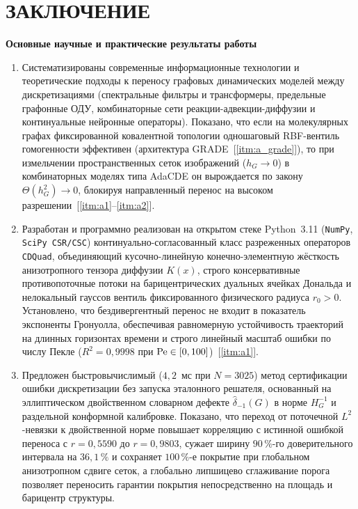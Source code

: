 
\chapter*{\large ЗАКЛЮЧЕНИЕ}

\textbf{Основные научные и практические результаты работы}

\begin{enumerate}
    \item Систематизированы современные информационные технологии и теоретические подходы к переносу графовых динамических моделей между дискретизациями (спектральные фильтры и трансформеры, предельные графонные ОДУ, комбинаторные сети реакции-адвекции-диффузии и континуальные нейронные операторы). Показано, что если на молекулярных графах фиксированной ковалентной топологии одношаговый RBF-вентиль гомогенности эффективен (архитектура GRADE~[\ref{itm:a_grade}]), то при измельчении пространственных сеток изображений ($h_G\to 0$) в комбинаторных моделях типа AdaCDE он вырождается по закону $\Theta(h_G^2)\to 0$, блокируя направленный перенос на высоком разрешении~[\ref{itm:a1}--\ref{itm:a2}].
    \item Разработан и программно реализован на открытом стеке Python~3.11 (\texttt{NumPy}, \texttt{SciPy CSR/CSC}) континуально-согласованный класс разреженных операторов \texttt{CDQuad}, объединяющий кусочно-линейную конечно-элементную жёсткость анизотропного тензора диффузии $K(x)$, строго консервативные противопоточные потоки на барицентрических дуальных ячейках Дональда и нелокальный гауссов вентиль фиксированного физического радиуса $r_0>0$. Установлено, что бездивергентный перенос не входит в показатель экспоненты Гронуолла, обеспечивая равномерную устойчивость траекторий на длинных горизонтах времени и строго линейный масштаб ошибки по числу Пекле ($R^2=0{,}9998$ при $\operatorname{Pe}\in[0,100]$)~[\ref{itm:a1}].
    \item Предложен быстровычислимый ($4{,}2$~мс при $N=3025$) метод сертификации ошибки дискретизации без запуска эталонного решателя, основанный на эллиптическом двойственном словарном дефекте $\widehat{\delta}_{-1}(G)$ в норме $H_G^{-1}$ и раздельной конформной калибровке. Показано, что переход от поточечной $L^2$-невязки к двойственной норме повышает корреляцию с истинной ошибкой переноса с $r=0{,}5590$ до $r=0{,}9803$, сужает ширину $90\,\%$-го доверительного интервала на $36{,}1\,\%$ и сохраняет $100\,\%$-е покрытие при глобальном анизотропном сдвиге сеток, а глобально липшицево сглаживание порога позволяет переносить гарантии покрытия непосредственно на площадь и барицентр структуры.

\end{enumerate}
